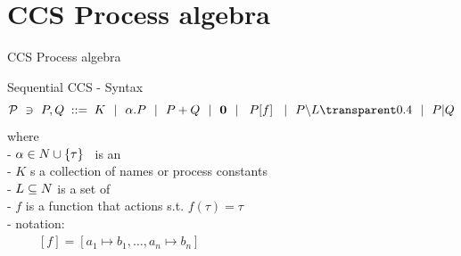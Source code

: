 \documentclass[aspectratio=169]{beamer}
\begin{document}
\section{CCS Process algebra}

\begin{slide}{CCS Process algebra}
\small

\begin{block}{Sequential CCS - Syntax}
\begin{equation*}
\mathcal{P} ~\ni~ P,Q\; ::=\; K ~~|~~ \alpha.P ~~|~~ P + Q ~~|~~ \cnil
        ~~|~~ \crn P f  ~~|~~ P\backslash L \faded{~~|~~ P|Q}
\end{equation*}
%
where
\\- $\alpha \in \Act %
    \cup \set{\tau}$~ is an 
\\- $K$ s a collection of  names or process constants
\\- $L \subseteq \Act %
    $ is a set of 
\\- $f$ is a function that  actions s.t. $f(\tau) = \tau$ %
\\- \alert{notation:}
\\~~~~~$[f] = [a_1\mapsto b_1,\ldots,a_n \mapsto b_n]$
\end{block}
\end{slide}

\end{document}
